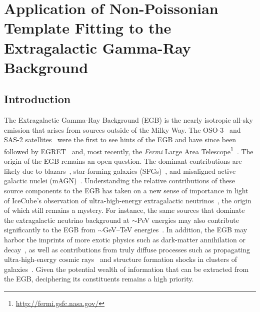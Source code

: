 \chapter{Application of Non-Poissonian Template Fitting to the Extragalactic Gamma-Ray Background}
\label{ch:igrb}

\setcounter{footnote}{0}

\section{Introduction}

The Extragalactic Gamma-Ray Background (EGB) is the nearly isotropic all-sky emission that arises from sources outside of the Milky Way.  The OSO-3~\cite{1968ApJ...153L.203C, 1972ApJ...177..341K} and SAS-2 satellites~\cite{1975ApJ...198..163F,1978ApJ...222..833F} were the first to see hints of the EGB and have since been followed by EGRET~\cite{1998ApJ...494..523S,2004ApJ...613..956S} and, most recently, the \emph{Fermi} Large Area Telescope\footnote{\url{http://fermi.gsfc.nasa.gov/}}~\cite{Ackermann:2014usa,TheFermi-LAT:2015ykq}.  The origin of the EGB remains an open question.  The dominant contributions are likely due to blazars~\cite{Stecker:1993ni, Stecker:1996ma, Muecke:1998cs, Narumoto:2006qg,Dermer:2007fg, Pavlidou:2007dv, Ajello:2009ip, Collaboration:2010gqa, Abazajian:2010pc,  Stecker:2010di,Singal:2011yi,  Ajello:2011zi, Ajello:2013lka,DiMauro:2013zfa, Ajello:2015mfa, Ackermann:2015uya}, star-forming galaxies (SFGs)~\cite{Soltan:1998jg,Pavlidou:2002va, Bhattacharya:2009yv, Ando:2009nk, Fields:2010bw, Makiya:2010zt, Ackermann:2012vca, Chakraborty:2012sh, Lacki:2012si, Tamborra:2014xia}, and misaligned active galactic nuclei (mAGN)~\cite{Stawarz:2005tq, Inoue:2011bm, Massaro:2011ww, DiMauro:2013xta, Hooper:2016gjy}.  Understanding the relative contributions of these source components to the EGB has taken on a new sense of importance in light of IceCube's observation of ultra-high-energy extragalactic neutrinos~\cite{Aartsen:2013bka,Aartsen:2013jdh,Aartsen:2015knd,Aartsen:2015rwa}, the origin of which still remains a mystery.  For instance, the same sources that dominate the extragalactic neutrino background at $\sim$PeV energies may also contribute significantly to the EGB from $\sim$GeV--TeV energies~\cite{Murase:2013rfa, Tamborra:2014xia,Hooper:2016gjy}.  In addition, the EGB may harbor the imprints of more exotic physics such as dark-matter annihilation or decay~\cite{Bengtsson:1990xf,Bergstrom:2001jj,Ullio:2002pj,Bottino:2004qi,Bertone:2004pz,Bringmann:2012ez,Ajello:2015mfa, DiMauro:2015tfa, Ackermann:2015tah}, as well as contributions from truly diffuse processes such as propagating ultra-high-energy cosmic rays~\cite{Loeb:2000aa,Kalashev:2007sn,Ahlers:2011sd,Murase:2012df,Taylor:2015rla} and structure formation shocks in clusters of galaxies~\cite{Murase:2008yt,Zandanel:2014pva}.
Given the potential wealth of information that can be extracted from the EGB, deciphering its constituents remains a high priority.     

